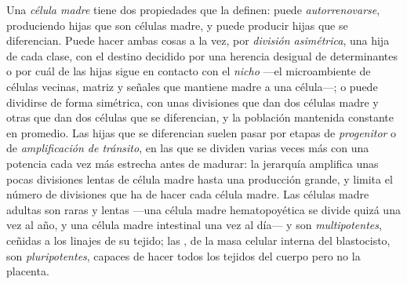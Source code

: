\begin{definition}\label{def:b3:stem-cells:stem}
Una \emph{célula madre} tiene dos propiedades que la definen: puede
\emph{autorrenovarse}, produciendo hijas que son células madre, y puede
producir hijas que se diferencian. Puede hacer ambas cosas a la vez,
por \emph{división asimétrica}, una hija de cada clase, con el destino
decidido por una herencia desigual de determinantes o por cuál de las
hijas sigue en contacto con el \emph{nicho} ---el microambiente de
células vecinas, matriz y señales que mantiene madre a una célula---; o
puede dividirse de forma simétrica, con unas divisiones que dan dos
células madre y otras que dan dos células que se diferencian, y la
población mantenida constante en promedio. Las hijas que se diferencian
suelen pasar por etapas de \emph{progenitor} o de \emph{amplificación
de tránsito}, en las que se dividen varias veces más con una potencia
cada vez más estrecha antes de madurar: la jerarquía amplifica unas
pocas divisiones lentas de célula madre hasta una producción grande, y
limita el número de divisiones que ha de hacer cada célula madre. Las
células madre adultas son raras y lentas ---una célula madre
hematopoyética se divide quizá una vez al año, y una célula madre
intestinal una vez al día--- y son \emph{multipotentes}, ceñidas a los
linajes de su tejido; las , de la masa
celular interna del blastocisto, son \emph{pluripotentes}, capaces de
hacer todos los tejidos del cuerpo pero no la placenta.
\end{definition}

